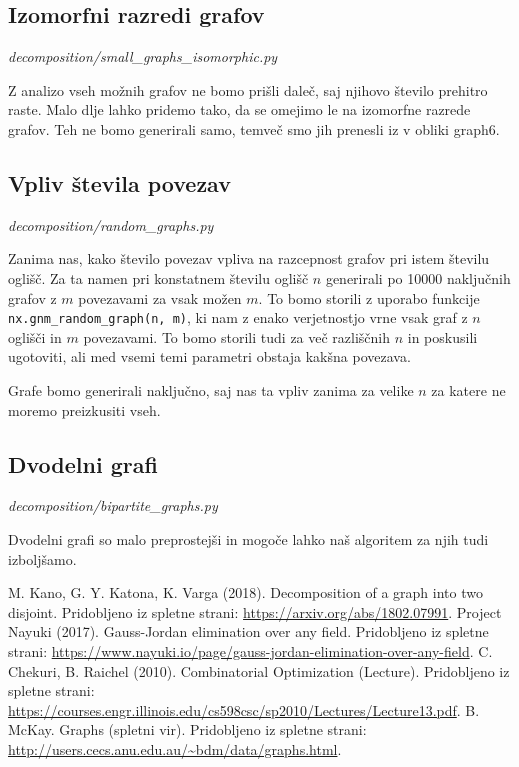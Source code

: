 \documentclass[12pt,a4paper]{amsart}
\theoremstyle{definition} %
\theoremstyle{plain} %
\begin{document}
\subsection{Izomorfni razredi grafov}
\emph{decomposition/small\_graphs\_isomorphic.py}

Z analizo vseh možnih grafov ne bomo prišli daleč, saj njihovo število prehitro raste. Malo dlje lahko pridemo tako, da se
omejimo le na izomorfne razrede grafov. Teh ne bomo generirali samo, temveč smo jih prenesli iz \cite{isomorph} v obliki graph6.

\subsection{Vpliv števila povezav}
\emph{decomposition/random\_graphs.py}

Zanima nas, kako število povezav vpliva na razcepnost grafov pri istem številu oglišč. Za ta namen pri konstatnem številu
oglišč $n$ generirali po 10000 naključnih grafov z $m$ povezavami za vsak možen $m$. To bomo storili z uporabo funkcije \texttt{nx.gnm\_random\_graph(n, m)},
ki nam z enako verjetnostjo vrne vsak graf z $n$ oglišči in $m$ povezavami. To bomo storili tudi za več razliščnih $n$ in
poskusili ugotoviti, ali med vsemi temi parametri obstaja kakšna povezava.

Grafe bomo generirali naključno, saj nas ta vpliv zanima za velike $n$ za katere ne moremo preizkusiti vseh.

\subsection{Dvodelni grafi}
\emph{decomposition/bipartite\_graphs.py}

Dvodelni grafi so malo preprostejši in mogoče lahko naš algoritem za njih tudi izboljšamo.

\begin{thebibliography}{9}

 M. Kano, G. Y. Katona, K. Varga (2018). Decomposition of a graph into two disjoint. Pridobljeno iz spletne strani: \url{https://arxiv.org/abs/1802.07991}.
 Project Nayuki (2017). Gauss-Jordan elimination over any field. Pridobljeno iz spletne strani: \url{https://www.nayuki.io/page/gauss-jordan-elimination-over-any-field}.
 C. Chekuri, B. Raichel (2010). Combinatorial Optimization (Lecture). Pridobljeno iz spletne strani: \url{https://courses.engr.illinois.edu/cs598csc/sp2010/Lectures/Lecture13.pdf}.
 B. McKay. Graphs (spletni vir). Pridobljeno iz spletne strani: \url{http://users.cecs.anu.edu.au/~bdm/data/graphs.html}.


\end{thebibliography}
\end{document}
